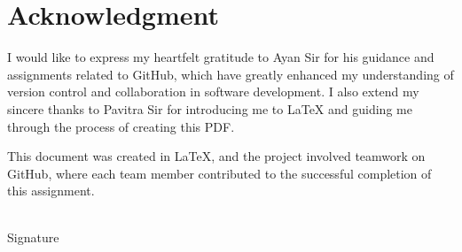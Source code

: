 \section*{Acknowledgment}

I would like to express my heartfelt gratitude to Ayan Sir for his guidance and assignments related to GitHub, which have greatly enhanced my understanding of version control and collaboration in software development. I also extend my sincere thanks to Pavitra Sir for introducing me to LaTeX and guiding me through the process of creating this PDF. 

This document was created in LaTeX, and the project involved teamwork on GitHub, where each team member contributed to the successful completion of this assignment.

\vspace{2cm}
\begin{flushright}
\makebox[2in]{\hrulefill} \\ 
Signature
\end{flushright}
